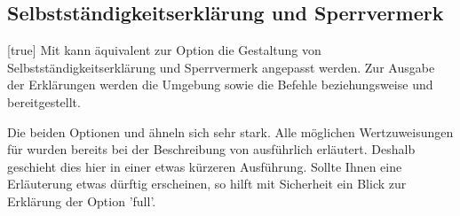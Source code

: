 \begin{Declaration*}{}
\begin{Declaration*}{}
\begin{Declaration*}{}
\subsection{Selbstständigkeitserklärung und Sperrvermerk}
%
%
%
\begin{Declaration}[%
  v2.02!\Option{declaration=multiple}:ersetzt \Option{declaration=double};%
  v2.02!\Option{declaration=tocleveldown};%
  v2.02!\Option{declaration=markboth};%
  v2.04!\Option{declaration=tocmultiple}%
]{}[true]%
\printdeclarationlist%
%
Mit  kann äquivalent zur Option  die 
Gestaltung von Selbstständigkeitserklärung und Sperrvermerk angepasst werden.
Zur Ausgabe der Erklärungen werden die Umgebung  
sowie die Befehle  beziehungsweise  und 
 bereitgestellt. 

Die beiden Optionen  und  ähneln sich sehr 
stark. Alle möglichen Wertzuweisungen für  wurden bereits 
bei der Beschreibung von  ausführlich erläutert. Deshalb 
geschieht dies hier in einer etwas kürzeren Ausführung. Sollte Ihnen eine 
Erläuterung etwas dürftig erscheinen, so hilft mit Sicherheit ein Blick zur 
Erklärung der Option 'full'.


\end{Declaration}
\end{Declaration*}
\end{Declaration*}
\end{Declaration*}

